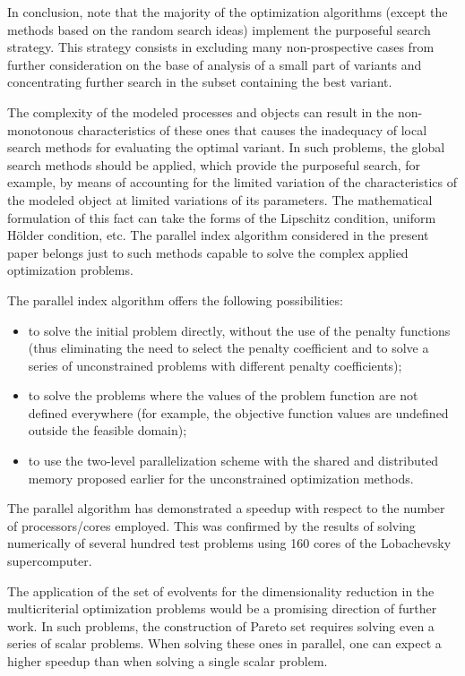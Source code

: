 \documentclass[smallextended]{svjour3}       %
\begin{document}
In conclusion, note that the majority of the optimization algorithms (except the methods based 
on the random search ideas) implement the purposeful search strategy. This strategy consists in 
excluding many non-prospective cases from further consideration on the base of 
analysis of a small part of variants and concentrating further search in the subset containing the 
best variant. 

The complexity of the modeled processes and objects can result in the non-monotonous
characteristics of these ones that causes the inadequacy of local search 
methods for evaluating the optimal variant. In such problems, the global search methods should 
be applied, which provide the purposeful search, for example, by means of accounting for the 
limited variation of the characteristics of the modeled object at limited variations of its 
parameters. The mathematical formulation of this fact can take the forms of the Lipschitz 
condition, uniform H\"older condition, etc. The parallel index algorithm considered in the 
present paper belongs just to such methods capable to solve the complex applied optimization 
problems. 

The parallel index algorithm %
offers the following possibilities:
\begin{itemize}
	\item to solve the initial problem directly, without the use of the penalty functions (thus 
eliminating the need to select the penalty coefficient and to solve a series of unconstrained 
problems with different penalty coefficients);
	\item to solve the problems where the values of the problem function are not defined 
everywhere (for example, the objective function values are undefined outside the feasible 
domain);
	\item to use the two-level parallelization scheme with the shared and distributed memory 
proposed earlier for the unconstrained optimization methods.
\end{itemize}

The parallel algorithm has demonstrated a speedup with respect to the number of 
processors/cores employed. This was confirmed by the results of solving numerically of several 
hundred test problems using 160 cores of the Lobachevsky supercomputer. 

The application of the set of evolvents for the dimensionality reduction in the multicriterial 
optimization problems would be a promising direction of further work. In such problems, the 
construction of Pareto set requires solving even a series of scalar problems. When solving these 
ones in parallel, one can expect a higher speedup than when solving a single scalar problem.
\end{document}
